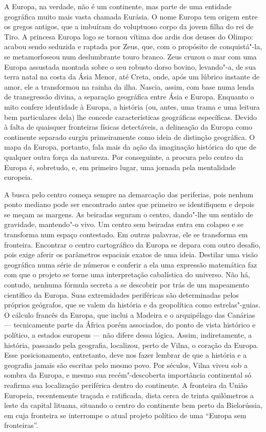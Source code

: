 A Europa, na verdade, não é um continente, mas parte de uma entidade
geográfica muito mais vasta chamada Eurásia. O nome Europa tem origem
entre os gregos antigos, que a imbuíram do voluptuoso corpo da jovem
filha do rei de Tiro. A princesa Europa logo se tornou vítima dos ardis
dos deuses do Olimpo: acabou sendo seduzida e raptada por Zeus, que, com
o propósito de conquistá"-la, se metamorfoseou num deslumbrante touro
branco. Zeus cruzou o mar com uma Europa assustada montada sobre o seu
robusto dorso bovino, levando"-a, de sua terra natal na costa da Ásia
Menor, até Creta, onde, após um lúbrico instante de amor, ele a
transformou na rainha da ilha. Nascia, assim, com base numa lenda de
transgressão divina, a separação geográfica entre Ásia e Europa.
Enquanto o mito confere identidade à Europa, a história (ou, antes, uma
trama e uma leitura bem particulares dela) lhe concede características
geográficas específicas. Devido à falta de quaisquer fronteiras físicas
detectáveis, a delineação da Europa como continente separado surgiu
primeiramente como ideia de distinção geográfica. O mapa da Europa,
portanto, fala mais da ação da imaginação histórica do que de qualquer
outra força da natureza. Por conseguinte, a procura pelo centro da
Europa é, sobretudo, e, em primeiro lugar, uma jornada pela mentalidade
europeia.

A busca pelo centro começa sempre na demarcação das periferias, pois
nenhum ponto mediano pode ser encontrado antes que primeiro se
identifiquem e depois se meçam as margens. As beiradas seguram o centro,
dando"-lhe um sentido de gravidade, mantendo"-o vivo. Um centro sem
beiradas entra em colapso e se transforma num espaço contestado. Em
outras palavras, ele se transforma em fronteira. Encontrar o centro
cartográfico da Europa se depara com outro desafio, pois exige aferir os
parâmetros espaciais exatos de uma ideia. Destilar uma visão geográfica
numa série de números e conferir a ela uma expressão matemática faz com
que o projeto se torne uma interpretação cabalística do universo. Não
há, contudo, nenhuma fórmula secreta a se descobrir por trás de um
mapeamento científico da Europa. Suas extremidades periféricas são
determinadas pelos próprios geógrafos, que se valem da história e da
geopolítica como estrelas"-guias. O cálculo francês da Europa, que inclui
a Madeira e o arquipélago das Canárias --- tecnicamente parte da África
porém associados, do ponto de vista histórico e político, a estados
europeus --- não difere dessa lógica. Assim, indiretamente, a história,
passando pela geografia, localizou, perto de Vilna, o coração da Europa.
Esse posicionamento, entretanto, deve nos fazer lembrar de que a
história e a geografia jamais são escritas pelo mesmo povo. Por séculos,
Vilna viveu sob a sombra da Europa, e mesmo sua recém"-descoberta
importância continental só reafirma sua localização periférica dentro do
continente. A fronteira da União Europeia, recentemente traçada e
ratificada, dista cerca de trinta quilômetros a leste da capital
lituana, situando o centro do continente bem perto da Bielorússia, em
cuja fronteira se interrompe o atual projeto político de uma ``Europa
sem fronteiras''.

